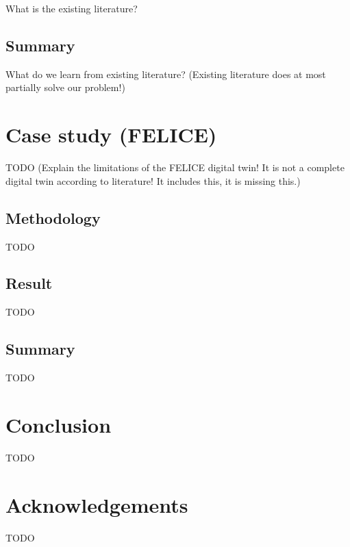 \documentclass[9pt,conference]{IEEEtran}
\begin{document}
    What is the existing literature?

    \subsection{Summary}
    \label{section:liteature_summary}

    What do we learn from existing literature?
    (Existing literature does at most partially solve our problem!)

    \section{Case study (FELICE)}
    \label{section:case}

    TODO (Explain the limitations of the FELICE digital twin! It is not a complete digital twin according to literature! It includes this, it is missing this.)

    \subsection{Methodology}
    \label{section:case_methodology}

    TODO

    \subsection{Result}
    \label{section:case_result}

    TODO

    \subsection{Summary}
    \label{section:case_summary}

    TODO

    \section{Conclusion}
    \label{section:conclusion}
    TODO

    \section*{Acknowledgements}
    TODO

    
    
\end{document}
